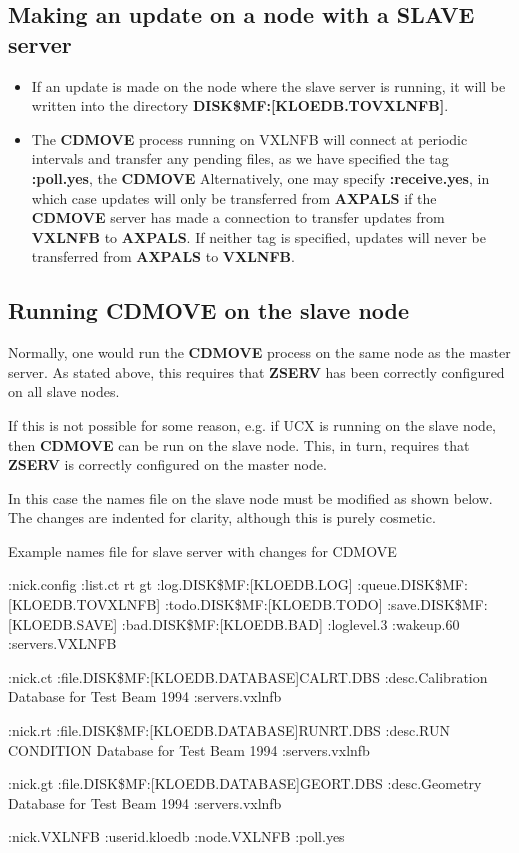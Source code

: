 \subsection{Making an update on a node with a {\bf SLAVE} server}
\begin{itemize}
\item
If an update is made on the node where the slave server is running,
it will be written into the directory {\bf DISK\$MF:[KLOEDB.TOVXLNFB]}.
\item
The {\bf CDMOVE} process running on VXLNFB will connect at
periodic intervals and transfer any pending files,
as we have specified the tag {\bf :poll.yes}, the {\bf CDMOVE}
Alternatively, one may specify
{\bf :receive.yes}, in which case updates will only be transferred
from {\bf AXPALS} if the {\bf CDMOVE} server has made a connection
to transfer updates from {\bf VXLNFB} to {\bf AXPALS}. If neither
tag is specified, updates will never be transferred from {\bf AXPALS}
to {\bf VXLNFB}.
\end{itemize}

\subsection{Running {\bf CDMOVE} on the slave node}

Normally, one would run the {\bf CDMOVE} process on the same
node as the master server. As stated above, this requires
that {\bf ZSERV} has been correctly configured on all slave
nodes.


If this is not possible for some reason, e.g. if UCX is running
on the slave node, then {\bf CDMOVE} can be run on the slave
node. This, in turn, requires that {\bf ZSERV} is correctly
configured on the master node.

In this case the names file on the slave node must be modified
as shown below.
The changes are indented for clarity, although this is purely
cosmetic.

\begin{XMPt}{Example names file for slave server with changes for CDMOVE}

:nick.config
:list.ct rt gt
:log.DISK\$MF:[KLOEDB.LOG]
:queue.DISK\$MF:[KLOEDB.TOVXLNFB]
:todo.DISK\$MF:[KLOEDB.TODO]
:save.DISK\$MF:[KLOEDB.SAVE]
:bad.DISK\$MF:[KLOEDB.BAD]
:loglevel.3
:wakeup.60
   :servers.VXLNFB

:nick.ct
:file.DISK\$MF:[KLOEDB.DATABASE]CALRT.DBS
:desc.Calibration Database for Test Beam 1994
:servers.vxlnfb

:nick.rt
:file.DISK\$MF:[KLOEDB.DATABASE]RUNRT.DBS
:desc.RUN CONDITION Database for Test Beam 1994
:servers.vxlnfb

:nick.gt
:file.DISK\$MF:[KLOEDB.DATABASE]GEORT.DBS
:desc.Geometry Database for Test Beam 1994
:servers.vxlnfb

   :nick.VXLNFB
   :userid.kloedb
   :node.VXLNFB
   :poll.yes

\end{XMPt}



